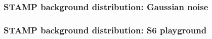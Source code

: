 \documentclass{beamer}
\begin{document}
\begin{frame}
    \frametitle{STAMP background distribution: Gaussian noise}

    \begin{figure}
        \centering
    \end{figure}

\end{frame}

\begin{frame}
    \frametitle{STAMP background distribution: S6 playground}

    \begin{figure}
        \centering
    \end{figure}

\end{frame}
\end{document}
